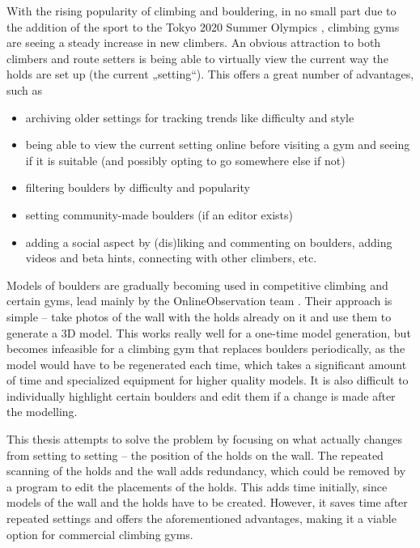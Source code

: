 
With the rising popularity of climbing and bouldering, in no small part due to the addition of the sport to the Tokyo 2020 Summer Olympics \cite{olympics}, climbing gyms are seeing a steady increase in new climbers.
An obvious attraction to both climbers and route setters is being able to virtually view the current way the holds are set up (the current „setting“).
This offers a great number of advantages, such as

\begin{itemize}
	\item archiving older settings for tracking trends like difficulty and style
	\item being able to view the current setting online before visiting a gym and seeing if it is suitable (and possibly opting to go somewhere else if not)
	\item filtering boulders by difficulty and popularity
	\item setting community-made boulders (if an editor exists)
	\item adding a social aspect by (dis)liking and commenting on boulders, adding videos and beta hints, connecting with other climbers, etc.
\end{itemize}

Models of boulders are gradually becoming used in competitive climbing and certain gyms, lead mainly by the OnlineObservation team \cite{onlineobservation}.
Their approach is simple -- take photos of the wall with the holds already on it and use them to generate a 3D model.
This works really well for a one-time model generation, but becomes infeasible for a climbing gym that replaces boulders periodically, as the model would have to be regenerated each time, which takes a significant amount of time and specialized equipment for higher quality models.
It is also difficult to individually highlight certain boulders and edit them if a change is made after the modelling.

This thesis attempts to solve the problem by focusing on what actually changes from setting to setting -- the position of the holds on the wall.
The repeated scanning of the holds and the wall adds redundancy, which could be removed by a program to edit the placements of the holds.
This adds time initially, since models of the wall and the holds have to be created.
However, it saves time after repeated settings and offers the aforementioned advantages, making it a viable option for commercial climbing gyms.

